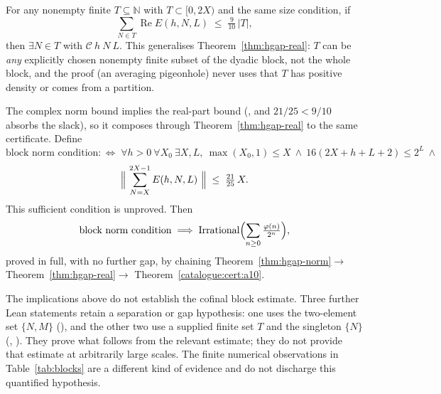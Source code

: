 \begin{thm}
\label{thm:hgap-subset}
For any nonempty finite $T\subseteq\mathbb N$ with $T\subset[0,2X)$ and the same size condition, if
\[
  \sum_{N\in T} \operatorname{Re}E(h,N,L) \;\le\; \tfrac{9}{10}\,|T| ,
\]
then $\exists N\in T$ with $\mathcal{C}\ h\ N\ L$. This generalises
Theorem~\ref{thm:hgap-real}: $T$ can be \emph{any} explicitly chosen nonempty finite subset of the
dyadic block, not the whole block, and the proof (an averaging pigeonhole) never uses
that $T$ has positive density or comes from a partition.
\end{thm}

\begin{thm}
\label{thm:hgap-norm}
The complex norm bound implies the real-part bound
(, and $21/25 < 9/10$ absorbs the slack), so it composes through
Theorem~\ref{thm:hgap-real} to the same certificate. Define
\[
  \text{block norm condition} :\Leftrightarrow\;
  \forall h{>}0\ \forall X_0\ \exists X, L,\ \max(X_0,1)\le X\ \wedge\ 16(2X{+}h{+}L{+}2)\le 2^L\ \wedge
\]
\[
  \Bigl\|\ \sum_{N=X}^{2X-1}E(h,N,L)\ \Bigr\| \;\le\; \tfrac{21}{25}\,X .
\]
This sufficient condition is unproved. Then
\[
  \text{block norm condition} \;\Longrightarrow\; \mathrm{Irrational}\Bigl(\sum_{n\ge 0}
  \tfrac{\varphi(n)}{2^n}\Bigr),
\]
proved in full, with no further gap, by chaining
Theorem~\ref{thm:hgap-norm}$\to$Theorem~\ref{thm:hgap-real}$\to$
Theorem~\ref{catalogue:cert:a10}.
\end{thm}

\begin{obs}
\label{obs:no-instance}
The implications above do not establish the cofinal block estimate.
Three further Lean statements retain a separation or gap hypothesis: one
uses the two-element set $\{N,M\}$
(),
and the other two use a supplied finite set $T$ and the singleton
$\{N\}$
(,
).
They prove what follows from the relevant estimate; they do not provide
that estimate at arbitrarily large scales. The finite numerical
observations in Table~\ref{tab:blocks} are a different kind of evidence
and do not discharge this quantified hypothesis.
\end{obs}

